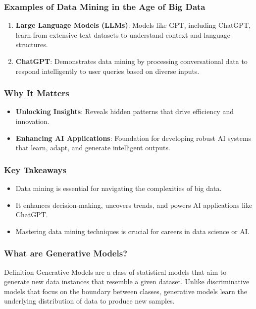 \documentclass[aspectratio=169]{beamer}
\begin{document}
\begin{frame}[fragile]
    \frametitle{Examples of Data Mining in the Age of Big Data}
    \begin{enumerate}
        \item \textbf{Large Language Models (LLMs)}: Models like GPT, including ChatGPT, learn from extensive text datasets to understand context and language structures.
        \item \textbf{ChatGPT}: Demonstrates data mining by processing conversational data to respond intelligently to user queries based on diverse inputs.
    \end{enumerate}
\end{frame}

\begin{frame}[fragile]
    \frametitle{Why It Matters}
    \begin{itemize}
        \item \textbf{Unlocking Insights}: Reveals hidden patterns that drive efficiency and innovation.
        \item \textbf{Enhancing AI Applications}: Foundation for developing robust AI systems that learn, adapt, and generate intelligent outputs.
    \end{itemize}
\end{frame}

\begin{frame}[fragile]
    \frametitle{Key Takeaways}
    \begin{itemize}
        \item Data mining is essential for navigating the complexities of big data.
        \item It enhances decision-making, uncovers trends, and powers AI applications like ChatGPT.
        \item Mastering data mining techniques is crucial for careers in data science or AI.
    \end{itemize}
\end{frame}

\begin{frame}[fragile]
    \frametitle{What are Generative Models?}
    \begin{block}{Definition}
        Generative Models are a class of statistical models that aim to generate new data instances that resemble a given dataset. Unlike discriminative models that focus on the boundary between classes, generative models learn the underlying distribution of data to produce new samples.
    \end{block}
\end{frame}
\end{document}
